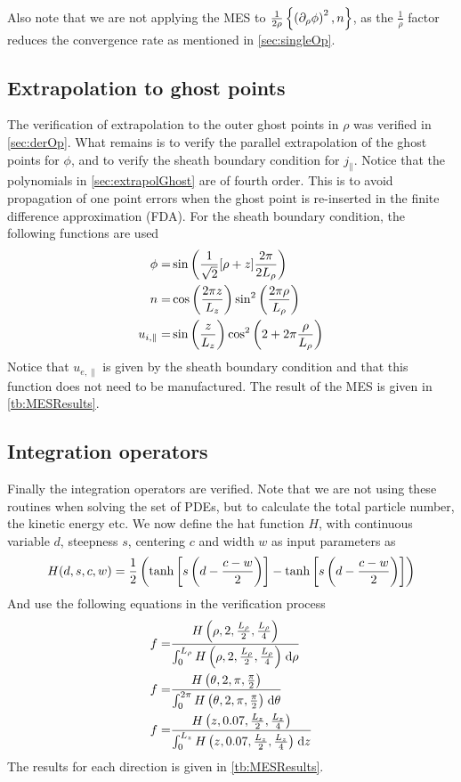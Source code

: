 Also note that we are not applying the MES to $\frac{1}{2\rho}\left\{\left(\partial_{\rho} \phi\right)^2,n\right\}$, as the $\frac{1}{\rho}$ factor reduces the convergence rate as mentioned in \cref{sec:singleOp}.

\subsection{Extrapolation to ghost points}
%
The verification of extrapolation to the outer ghost points in $\rho$ was verified in \cref{sec:derOp}.
What remains is to verify the parallel extrapolation of the ghost points for $\phi$, and to verify the sheath boundary condition for $j_{\|}$.
Notice that the polynomials in \cref{sec:extrapolGhost} are of fourth order.
This is to avoid propagation of one point errors when the ghost point is re-inserted in the finite difference approximation (FDA).
For the sheath boundary condition, the following functions are used
%
\begin{align}
    \phi =& \sin\left(\frac{1}{\sqrt{2}}[\rho + z]\frac{2\pi}{2L_\rho}\right)
    \label{eq:MESPhiSheath}
    \\
    n =& \cos\left(\frac{2\pi z}{L_z}\right)\sin^2\left(\frac{2\pi\rho}{L_\rho}\right)
    \label{eq:MESNSheath}
    \\
    u_{i, \|} =& \sin\left(\frac{z}{L_z}\right)\cos^2\left(2+2\pi\frac{\rho}{L_\rho}\right)
    \label{eq:MEUISheath}
\end{align}
%
Notice that $u_{e,\|}$ is given by the sheath boundary condition and that this function does not need to be manufactured.
The result of the MES is given in \cref{tb:MESResults}.

\subsection{Integration operators}
%
Finally the integration operators are verified.
Note that we are not using these routines when solving the set of PDEs, but to calculate the total particle number, the kinetic energy etc.
We now define the hat function $H$, with continuous variable $d$, steepness $s$, centering $c$ and width $w$ as input parameters as
%
\begin{align}
    H(d,s,c,w) = \frac{1}{2}\left(\tanh\left[s\left(d-\frac{c-w}{2}\right)\right]-\tanh\left[s\left(d-\frac{c-w}{2}\right)\right]\right)
    \label{eq:hat}
\end{align}
%
And use the following equations in the verification process
%
\begin{align}
f =& \frac{H\left(\rho, 2,\frac{L_\rho}{2}, \frac{L_\rho}{4}\right)}{\int_{0}^{L_\rho} {H\left(\rho, 2,\frac{L_\rho}{2}, \frac{L_\rho}{4}\right)} \; \text{d} {\rho}}
\label{eq:MESRhoInt}
\\
f =& \frac{H\left(\theta, 2,\pi, \frac{\pi}{2}\right)}{\int_{0}^{2\pi} {H\left(\theta, 2,\pi, \frac{\pi}{2}\right)} \; \text{d} {\theta}}
\label{eq:MESThetaInt}
\\
f =& \frac{H\left(z, 0.07,\frac{L_z}{2}, \frac{L_z}{4}\right)}{\int_{0}^{L_z} {H\left(z, 0.07,\frac{L_z}{2}, \frac{L_z}{4}\right)} \; \text{d} {z}}
\label{eq:MESZInt}
\end{align}
%
The results for each direction is given in \cref{tb:MESResults}.

